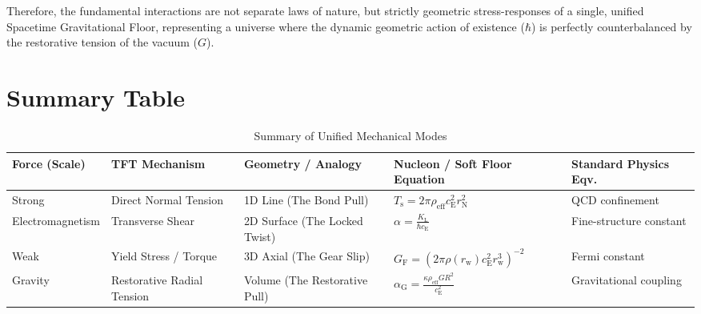 Therefore, the fundamental interactions are not separate laws of nature, but strictly geometric stress-responses of a single, unified Spacetime Gravitational Floor, representing a universe where the dynamic geometric action of existence ($\hbar$) is perfectly counterbalanced by the restorative tension of the vacuum ($G$).

\section{Summary Table}

\begin{table}[H]
    \centering
    \caption{Summary of Unified Mechanical Modes}
    \label{tab:unified_modes}
    \vspace{0.5em}
    \renewcommand{\arraystretch}{1.5}
    \small
    \begin{tabular}{@{} l p{3.0cm} p{3.8cm} p{3.5cm} p{2.5cm} @{}}
        \toprule
        \textbf{Force (Scale)} & \textbf{TFT Mechanism} & \textbf{Geometry / Analogy} & \textbf{Nucleon / Soft Floor Equation} & \textbf{Standard Physics Eqv.} \\
        \midrule
        Strong & Direct Normal Tension & 1D Line (The Bond Pull) & $T_{\mathrm{s}} = 2\pi \rho_{\mathrm{eff}} c_{\mathrm{E}}^2 r_{\mathrm{N}}^2$ & QCD confinement \\
        Electromagnetism & Transverse Shear & 2D Surface (The Locked Twist) & $\alpha = \frac{K_{\mathrm{L}}}{\hbar c_{\mathrm{E}}}$ & Fine-structure constant \\
        Weak & Yield Stress / Torque & 3D Axial (The Gear Slip) & $G_{\mathrm{F}} = (2\pi \rho(r_{\mathrm{w}}) c_{\mathrm{E}}^2 r_{\mathrm{w}}^3)^{-2}$ & Fermi constant \\
        Gravity & Restorative Radial Tension & Volume (The Restorative Pull) & $\alpha_{\mathrm{G}} = \frac{\kappa \rho_{\mathrm{eff}} G R^2}{c_{\mathrm{E}}^2}$ & Gravitational coupling \\
        \bottomrule
    \end{tabular}
\end{table}